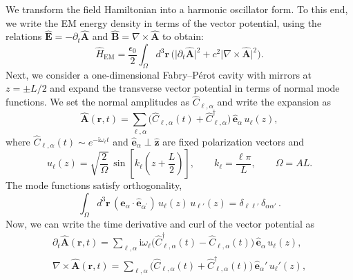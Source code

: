 We transform the field Hamiltonian into a harmonic oscillator form. 
To this end, we write the EM energy density in terms of the vector potential, using the relations $\hat{\bm E} = -\partial_t \hat{\bm A}$ and $\hat{\bm B} = \nabla \times \hat{\bm A}$ to obtain:
\begin{equation}
\hat{H}_\mathrm{EM}
= \frac{\epsilon_0}{2} \int_\Omega d^3 \bm r \,\Big(\bigl|\partial_t \hat{\bm A} \bigr|^2
+ c^2 \bigl|\nabla \times \hat{\bm A}\bigr|^2 \Big).
\label{eq:Hem_inA}
\end{equation}
Next, we consider a one-dimensional Fabry--Pérot cavity with mirrors at $z=\pm L/2$ and expand the transverse vector potential in terms of normal mode functions. We set the normal amplitudes as $\hat{C}_{\ell,\alpha}$ and write the expansion as
\begin{equation}
\hat{\bm A}(\bm r,t)
= \sum_{\ell,\alpha} \bigl(\hat{C}_{\ell,\alpha} (t)
+ \hat{C}_{\ell,\alpha}^\dagger \bigr)\,
\hat{\bm e}_\alpha\, u_\ell(z),
\end{equation}
where $\hat{C}_{\ell,\alpha}(t) \sim e^{-\mathrm{i}\omega_\ell t}$ and $\hat{\bm e}_\alpha \perp \hat{\bm z}$ are fixed polarization vectors and 
\begin{equation}
u_\ell(z) = \sqrt{\frac{2}{\Omega}}\,\sin\!\left[k_\ell\!\left(z+\frac{L}{2}\right)\right], \qquad
k_\ell=\frac{\ell\pi}{L}, \qquad \Omega = AL.
\end{equation}
The mode functions satisfy orthogonality,
\begin{equation}
\int_\Omega d^3\bm r\,(\hat{\bm e}_\alpha \!\cdot\! \hat{\bm e}_{\alpha^\prime})\,u_\ell(z)\,u_{\ell'}(z)
= \delta_{\ell\ell'}\,\delta_{\alpha\alpha'} \,.
\end{equation}
Now, we can write the time derivative and curl of the vector potential as 
\begin{gather}
\partial_t \hat{\bm A}(\bm r,t)
= \sum_{\ell,\alpha} \mathrm{i}\omega_\ell\bigl(\hat{C}_{\ell,\alpha}^\dagger(t)-\hat{C}_{\ell,\alpha}(t)\bigr)\,
\hat{\bm e}_\alpha\,u_\ell(z), \label{eq:partialtA}\\
\nabla\times \hat{\bm A}(\bm r,t)
= \sum_{\ell,\alpha} \bigl(\hat{C}_{\ell,\alpha}(t)+\hat{C}_{\ell,\alpha}^\dagger(t)\bigr)\,
\hat{\bm e}_\alpha'\,u_\ell'(z), \label{eq:curlA}
\end{gather}
